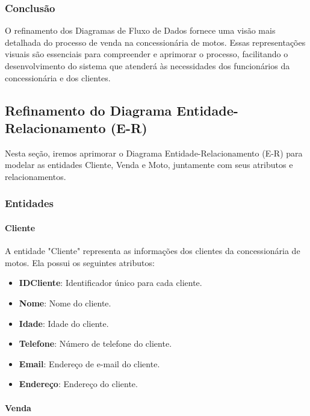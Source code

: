 \subsubsection{Conclusão}

O refinamento dos Diagramas de Fluxo de Dados fornece uma visão mais detalhada do processo de venda na concessionária de motos. Essas representações visuais são essenciais para compreender e aprimorar o processo, facilitando o desenvolvimento do sistema que atenderá às necessidades dos funcionários da concessionária e dos clientes.

\subsection{Refinamento do Diagrama Entidade-Relacionamento (E-R)}

Nesta seção, iremos aprimorar o Diagrama Entidade-Relacionamento (E-R) para modelar as entidades Cliente, Venda e Moto, juntamente com seus atributos e relacionamentos.

\subsubsection{Entidades}

\paragraph{Cliente}

A entidade "Cliente" representa as informações dos clientes da concessionária de motos. Ela possui os seguintes atributos:

\begin{itemize}
	\item \textbf{IDCliente}: Identificador único para cada cliente.
	\item \textbf{Nome}: Nome do cliente.
	\item \textbf{Idade}: Idade do cliente.
	\item \textbf{Telefone}: Número de telefone do cliente.
	\item \textbf{Email}: Endereço de e-mail do cliente.
	\item \textbf{Endereço}: Endereço do cliente.
\end{itemize}

\paragraph{Venda}

